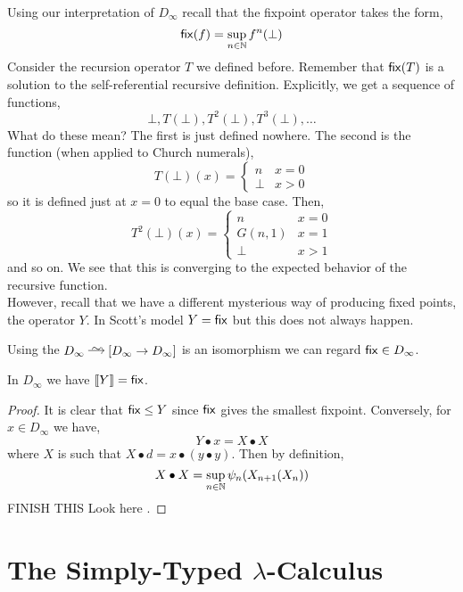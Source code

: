 \documentclass[12pt]{article}
\newcommand{\br}[1]{\llbracket #1 \rrbracket}
\begin{document}
Using our interpretation of $D_{\infty}$ recall that the fixpoint operator takes the form,
\[ \mathsf{fix}(f) = \sup_{n \in \mathbb{N}} f^n(\bot) \]
Consider the recursion operator $T$ we defined before. Remember that $\mathsf{fix}(T)$ is a solution to the self-referential recursive definition. Explicitly, we get a sequence of functions,
\[ \bot, T(\bot), T^2(\bot), T^3(\bot), \dots \]
What do these mean? The first is just defined nowhere. The second is the function (when applied to Church numerals),
\[ T(\bot)(x) = \begin{cases}
n & x = 0
\\
\bot & x > 0
\end{cases} \]
so it is defined just at $x = 0$ to equal the base case. Then,
\[  T^2(\bot)(x) = 
\begin{cases}
n & x = 0
\\
G(n, 1) & x = 1
\\
\bot & x > 1
\end{cases}
\]
and so on. We see that this is converging to the expected behavior of the recursive function. 
\bigskip\\
However, recall that we have a different mysterious way of producing fixed points, the operator $Y$. In Scott's model $Y = \mathsf{fix}$ but this does not always happen.

\begin{rmk}
Using the $D_{\infty} \iso [D_{\infty} \to D_{\infty}]$ is an isomorphism we can regard $\mathsf{fix} \in D_{\infty}$. 
\end{rmk}

\begin{prop}
In $D_{\infty}$ we have $\br{Y} = \fix$.
\end{prop}

\begin{proof}
It is clear that $\mathsf{fix} \le Y$ since $\mathsf{fix}$ gives the smallest fixpoint. Conversely, for $x \in D_{\infty}$ we have,
\[ Y \bullet x = X \bullet X \]
where $X$ is such that $X \bullet d = x \bullet (y \bullet y)$. Then by definition,
\[ X \bullet X = \sup_{n \in \mathbb{N}} \psi_n(X_{n+1}(X_n)) \]
{\color{red} FINISH THIS}
Look here .
\end{proof}

\section{The Simply-Typed $\lambda$-Calculus}
\end{document}
